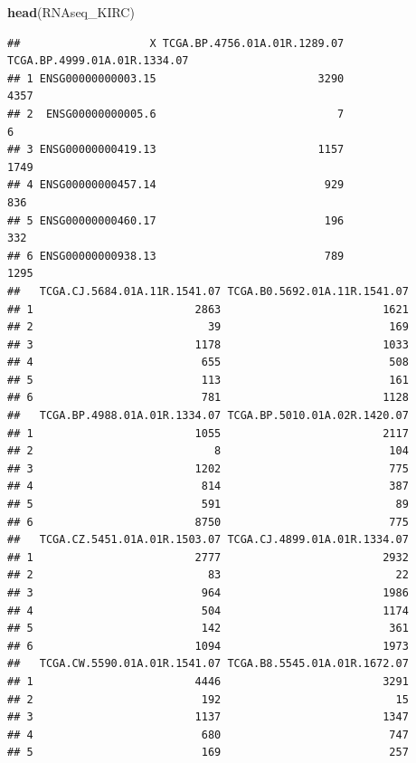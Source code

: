 \documentclass[
]{article}
\newenvironment{Shaded}{\begin{snugshade}}{\end{snugshade}}
\newcommand{\FunctionTok}[1]{\textcolor[rgb]{0.13,0.29,0.53}{\textbf{#1}}}
\newcommand{\NormalTok}[1]{#1}
\begin{document}
\begin{Shaded}
\begin{Highlighting}[]
\FunctionTok{head}\NormalTok{(RNAseq\_KIRC)}
\end{Highlighting}
\end{Shaded}

\begin{verbatim}
##                    X TCGA.BP.4756.01A.01R.1289.07 TCGA.BP.4999.01A.01R.1334.07
## 1 ENSG00000000003.15                         3290                         4357
## 2  ENSG00000000005.6                            7                            6
## 3 ENSG00000000419.13                         1157                         1749
## 4 ENSG00000000457.14                          929                          836
## 5 ENSG00000000460.17                          196                          332
## 6 ENSG00000000938.13                          789                         1295
##   TCGA.CJ.5684.01A.11R.1541.07 TCGA.B0.5692.01A.11R.1541.07
## 1                         2863                         1621
## 2                           39                          169
## 3                         1178                         1033
## 4                          655                          508
## 5                          113                          161
## 6                          781                         1128
##   TCGA.BP.4988.01A.01R.1334.07 TCGA.BP.5010.01A.02R.1420.07
## 1                         1055                         2117
## 2                            8                          104
## 3                         1202                          775
## 4                          814                          387
## 5                          591                           89
## 6                         8750                          775
##   TCGA.CZ.5451.01A.01R.1503.07 TCGA.CJ.4899.01A.01R.1334.07
## 1                         2777                         2932
## 2                           83                           22
## 3                          964                         1986
## 4                          504                         1174
## 5                          142                          361
## 6                         1094                         1973
##   TCGA.CW.5590.01A.01R.1541.07 TCGA.B8.5545.01A.01R.1672.07
## 1                         4446                         3291
## 2                          192                           15
## 3                         1137                         1347
## 4                          680                          747
## 5                          169                          257

\end{verbatim}
\end{document}
